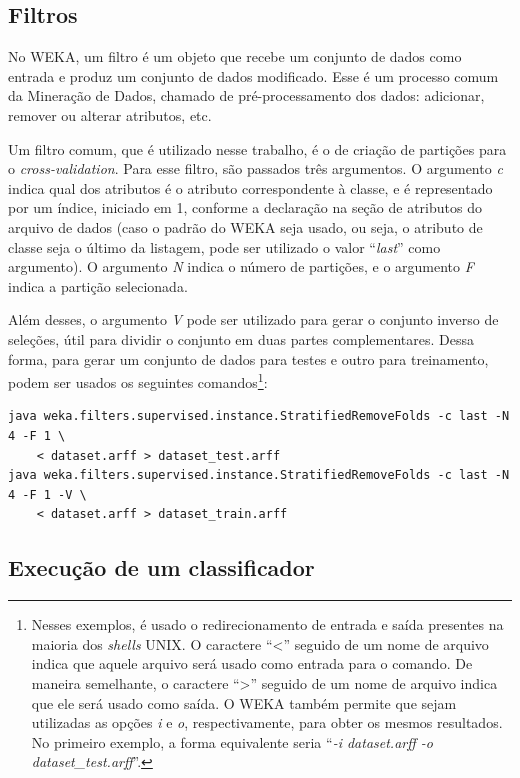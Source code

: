 \subsection{Filtros}

No WEKA, um filtro é um objeto que recebe um conjunto de dados como entrada e produz um conjunto de dados modificado. Esse é um processo comum da Mineração de Dados, chamado de pré-processamento dos dados: adicionar, remover ou alterar atributos, etc.

Um filtro comum, que é utilizado nesse trabalho, é o de criação de partições para o \emph{cross-validation}. Para esse filtro, são passados três argumentos. O argumento \emph{c} indica qual dos atributos é o atributo correspondente à classe, e é representado por um índice, iniciado em 1, conforme a declaração na seção de atributos do arquivo de dados (caso o padrão do WEKA seja usado, ou seja, o atributo de classe seja o último da listagem, pode ser utilizado o valor ``\emph{last}'' como argumento). O argumento \emph{N} indica o número de partições, e o argumento \emph{F} indica a partição selecionada.

Além desses, o argumento \emph{V} pode ser utilizado para gerar o conjunto inverso de seleções, útil para dividir o conjunto em duas partes complementares. Dessa forma, para gerar um conjunto de dados para testes e outro para treinamento, podem ser usados os seguintes comandos\footnote{Nesses exemplos, é usado o redirecionamento de entrada e saída presentes na maioria dos \emph{shells} UNIX. O caractere ``<'' seguido de um nome de arquivo indica que aquele arquivo será usado como entrada para o comando. De maneira semelhante, o caractere ``>'' seguido de um nome de arquivo indica que ele será usado como saída. O WEKA também permite que sejam utilizadas as opções \emph{i} e \emph{o}, respectivamente, para obter os mesmos resultados. No primeiro exemplo, a forma equivalente seria ``\emph{-i dataset.arff -o dataset\_test.arff}''.}:

\begin{lstlisting}[caption=Filtro para geração de partições para \emph{cross-validation}, label=lst:dev_filter]
java weka.filters.supervised.instance.StratifiedRemoveFolds -c last -N 4 -F 1 \
    < dataset.arff > dataset_test.arff
java weka.filters.supervised.instance.StratifiedRemoveFolds -c last -N 4 -F 1 -V \
    < dataset.arff > dataset_train.arff
\end{lstlisting}

\subsection{Execução de um classificador}

